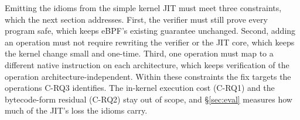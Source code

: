 Emitting the idioms from the simple kernel JIT must meet three constraints, which the next section addresses.
First, the verifier must still prove every program safe, which keeps eBPF's existing guarantee unchanged.
Second, adding an operation must not require rewriting the verifier or the JIT core, which keeps the kernel change small and one-time.
Third, one operation must map to a different native instruction on each architecture, which keeps verification of the operation architecture-independent.
Within these constraints the fix targets the operations C-RQ3 identifies.
The in-kernel execution cost (C-RQ1) and the bytecode-form residual (C-RQ2) stay out of scope, and \S\ref{sec:eval} measures how much of the JIT's loss the idioms carry.
